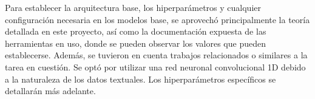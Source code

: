 Para establecer la arquitectura base, los hiperparámetros y cualquier configuración necesaria en los modelos base, se aprovechó principalmente la teoría detallada en este proyecto, así como la documentación expuesta de las herramientas en uso, donde se pueden observar los valores que pueden establecerse. Además, se tuvieron en cuenta trabajos relacionados o similares a la tarea en cuestión. Se optó por utilizar una red neuronal convolucional 1D debido a la naturaleza de los datos textuales. Los hiperparámetros específicos se detallarán más adelante.


